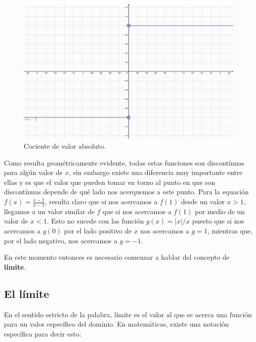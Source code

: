 \documentclass[
]{book}
\begin{document}
\begin{figure}

{\centering \includegraphics[width=41.67in]{Unidad-III/Deriv-absol} 

}

\caption{Cociente de valor absoluto.}\label{fig:absol}
\end{figure}

Como resulta geométricamente evidente, todas estas funciones son discontínuas para algún valor de \(x\), sin embargo existe una diferencia muy importante entre ellas y es que el valor que pueden tomar en torno al punto en que son discontínuas depende de qué lado nos acerquemos a este punto. Para la equación \(f(x) = \frac{x-1}{x-1}\), resulta claro que si nos acercamos a \(f(1)\) desde un valor \(x>1\), llegamos a un valor similar de \(f\) que si nos acercamos a \(f(1)\) por medio de un valor de \(x < 1\). Esto no sucede con las función \(g(x) = |x|/x\) puesto que si nos acercamos a \(g(0)\) por el lado positivo de \(x\) nos acercamos a \(g = 1\), mientras que, por el lado negativo, nos acercamos a \(g = -1\).

En este momento entonces es necesario comenzar a hablar del concepto de \textbf{límite}.

\hypertarget{el-luxedmite}{%
\subsection{El límite}\label{el-luxedmite}}

En el sentido estricto de la palabra, límite es el valor al que se acerca una función para un valor específico del dominio. En matemáticas, existe una notación específica para decir esto:
\end{document}
